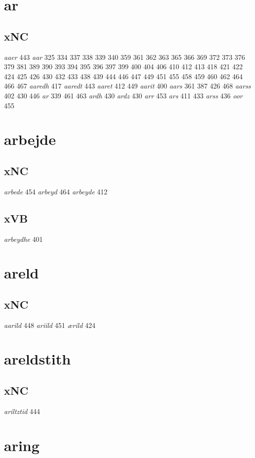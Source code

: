 \documentclass[a4paper,twocolumn]{article}
\begin{document}
\section{ar}
\label{sec:orge46528c}
\subsection{xNC}
\label{sec:org6e369dd}
\emph{aaer} 443 \emph{aar} 325 334 337 338 339 340 359 361 362 363 365 366 369 372 373 376 379 381 389 390 393 394 395 396 397 399 400 404 406 410 412 413 418 421 422 424 425 426 430 432 433 438 439 444 446 447 449 451 455 458 459 460 462 464 466 467 \emph{aaredh} 417 \emph{aaredt} 443 \emph{aaret} 412 449 \emph{aarit} 400 \emph{aars} 361 387 426 468 \emph{aarss} 402 430 446 \emph{ar} 339 461 463 \emph{ardh} 430 \emph{ardz} 430 \emph{arr} 453 \emph{ars} 411 433 \emph{arss} 436 \emph{oor} 455 
\section{arbejde}
\label{sec:orgad644d2}
\subsection{xNC}
\label{sec:org5b79f4f}
\emph{arbede} 454 \emph{arbeyd} 464 \emph{arbeyde} 412 
\subsection{xVB}
\label{sec:org8f268f8}
\emph{arbeydhe} 401 
\section{areld}
\label{sec:org0b1ffb5}
\subsection{xNC}
\label{sec:org52a39e9}
\emph{aarild} 448 \emph{ariild} 451 \emph{ærild} 424 
\section{areldstith}
\label{sec:orgea77fc1}
\subsection{xNC}
\label{sec:orgdfe5d24}
\emph{ariltztid} 444 
\section{aring}
\label{sec:org503921f}
\end{document}
